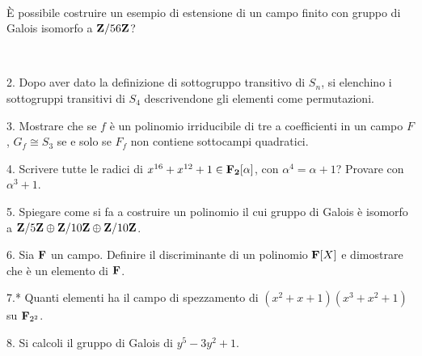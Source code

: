 \ \dotfill\ \bigskip\bigskip\bigskip\vfil

 \`E possibile costruire un esempio di estensione di un campo finito con gruppo di Galois isomorfo
a ${\bf Z}/56{\bf Z}$?\medskip\bigskip\bigskip

\ \dotfill\ \bigskip\bigskip\bigskip

\vfil\eject


\item{2.} Dopo aver dato la definizione di sottogruppo transitivo di
$S_n$, si elenchino i sottogruppi transitivi di $S_4$ descrivendone gli
elementi come permutazioni.

\vv


\item{3.} Mostrare che se $f$ \`{e} un polinomio irriducibile di tre a coefficienti
in un campo $F$, $G_f \cong S_3$ se e solo se $F_f$ non contiene sottocampi quadratici.
\ve\ \vs


\item{4.} Scrivere tutte le radici di $x^{16}+x^{12}+ 1\in {\bf F_2}[\alpha]$, con $\alpha^4=\alpha+1$? Provare con $\alpha^3+1$.\vv

\item{5.} Spiegare come si fa a costruire un polinomio il cui gruppo di Galois \`e isomorfo a ${\bf Z}/5{\bf Z} \oplus {\bf Z}/10{\bf Z} \oplus {\bf Z}/10{\bf Z}$. 
\ve\ \vs


\item{6.} Sia ${\bf F}$ un campo. Definire il discriminante di un polinomio ${\bf F}[X]$ e dimostrare che \`e un elemento di
${\bf F}$.\vskip 6cm\bigskip\bigskip\bigskip\vv\vv


\item{7.*} Quanti elementi ha il campo di spezzamento di
$(x^2+x+1)(x^3+x^2+1)$ su ${\bf F}_{2^2}$.\vskip 3cm\bigskip\bigskip\bigskip\vv\vv

\item{8.} Si calcoli il gruppo di Galois di $y^5 - 3y^2 + 1$.\vv

\ \vst
 \bye
